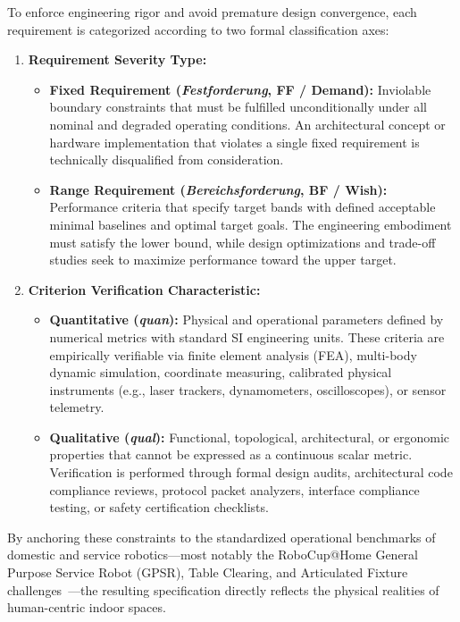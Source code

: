 To enforce engineering rigor and avoid premature design convergence, each requirement is categorized according to two formal classification axes:
\begin{enumerate}[leftmargin=1.5em]
  \item \textbf{Requirement Severity Type:}
  \begin{itemize}[leftmargin=1.2em]
    \item \textbf{Fixed Requirement (\emph{Festforderung}, FF / Demand):} Inviolable boundary constraints that must be fulfilled unconditionally under all nominal and degraded operating conditions. An architectural concept or hardware implementation that violates a single fixed requirement is technically disqualified from consideration.
    \item \textbf{Range Requirement (\emph{Bereichsforderung}, BF / Wish):} Performance criteria that specify target bands with defined acceptable minimal baselines and optimal target goals. The engineering embodiment must satisfy the lower bound, while design optimizations and trade-off studies seek to maximize performance toward the upper target.
  \end{itemize}
  \item \textbf{Criterion Verification Characteristic:}
  \begin{itemize}[leftmargin=1.2em]
    \item \textbf{Quantitative (\emph{quan}):} Physical and operational parameters defined by numerical metrics with standard SI engineering units. These criteria are empirically verifiable via finite element analysis (FEA), multi-body dynamic simulation, coordinate measuring, calibrated physical instruments (e.g., laser trackers, dynamometers, oscilloscopes), or sensor telemetry.
    \item \textbf{Qualitative (\emph{qual}):} Functional, topological, architectural, or ergonomic properties that cannot be expressed as a continuous scalar metric. Verification is performed through formal design audits, architectural code compliance reviews, protocol packet analyzers, interface compliance testing, or safety certification checklists.
  \end{itemize}
\end{enumerate}

By anchoring these constraints to the standardized operational benchmarks of domestic and service robotics---most notably the RoboCup@Home General Purpose Service Robot (GPSR), Table Clearing, and Articulated Fixture challenges~\cite{robocupathome}---the resulting specification directly reflects the physical realities of human-centric indoor spaces.


